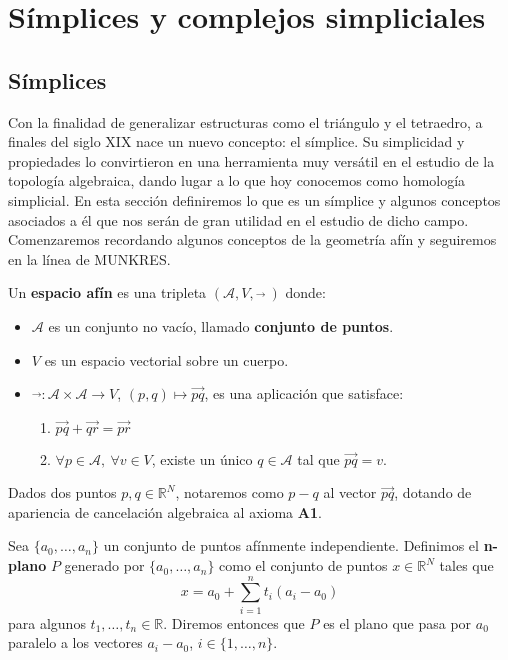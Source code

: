 
\chapter{Símplices y complejos simpliciales}

\section{Símplices}

Con la finalidad de generalizar estructuras como el triángulo y el tetraedro, 
a finales del siglo XIX nace un nuevo concepto: el símplice. Su simplicidad y 
propiedades lo convirtieron en una herramienta muy versátil en el estudio de la
topología algebraica, dando lugar a lo que hoy conocemos como homología simplicial. 
En esta sección definiremos lo que es un símplice y algunos conceptos asociados a él
que nos serán de gran utilidad en el estudio de dicho campo. Comenzaremos recordando algunos conceptos de la geometría afín y seguiremos en la línea de MUNKRES.

\begin{definicion}
	Un \textbf{espacio afín} es una tripleta $(\mathcal{A}, V, \vec{}\ )$ donde:
	\begin{itemize}
		\item $\mathcal{A}$ es un conjunto no vacío, llamado \textbf{conjunto de puntos}.
		\item $V$ es un espacio vectorial sobre un cuerpo.
		\item $\vec{}: \mathcal{A} \times \mathcal{A} \rightarrow V$, $(p,q) \mapsto \vec{pq}$, 
		es una aplicación que satisface:
		\begin{enumerate}[label=\textbf{A\arabic*.}, ref=A\arabic*]
			\item $\vec{pq} + \vec{qr} = \vec{pr}$
			\item $\forall p \in \mathcal{A},\ \forall v \in V$, existe un único $q \in 
			\mathcal{A}$ tal que $\vec{pq} = v$.
		\end{enumerate}
	\end{itemize}
\end{definicion}

Dados dos puntos $p,q \in \mathbb{R}^N$, notaremos como $p - q$ al vector 
$\vec{pq}$, dotando de apariencia de cancelación algebraica al axioma \textbf{A1}. 

\begin{definicion}
	Sea $\{a_0, \dots, a_n\}$ un conjunto de puntos afínmente independiente. 
	Definimos el \textbf{n-plano} $P$ generado por $\{a_0, \dots, a_n\}$ como
	el conjunto de puntos $x \in \mathbb{R}^N$ tales que
	\[ x = a_0 + \sum_{i=1}^{n}t_i(a_i - a_0) \]
	para algunos $t_1, \dots, t_n \in \mathbb{R}$. Diremos entonces que $P$ es el 
	plano que pasa por $a_0$ paralelo a los vectores $a_i - a_0$, $i \in \{1, \dots, n\}$.
\end{definicion}

